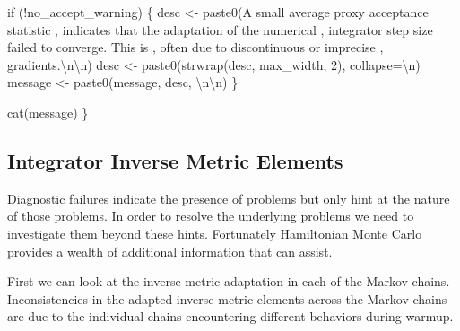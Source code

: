 \documentclass[
  letterpaper,
  DIV=11,
  numbers=noendperiod]{scrartcl}
\newenvironment{Shaded}{\begin{snugshade}}{\end{snugshade}}
\newcommand{\CharTok}[1]{\textcolor[rgb]{0.13,0.47,0.30}{#1}}
\newcommand{\ControlFlowTok}[1]{\textcolor[rgb]{0.00,0.23,0.31}{#1}}
\newcommand{\DecValTok}[1]{\textcolor[rgb]{0.68,0.00,0.00}{#1}}
\newcommand{\NormalTok}[1]{\textcolor[rgb]{0.00,0.23,0.31}{#1}}
\newcommand{\OperatorTok}[1]{\textcolor[rgb]{0.37,0.37,0.37}{#1}}
\newcommand{\StringTok}[1]{\textcolor[rgb]{0.13,0.47,0.30}{#1}}
\begin{document}
\begin{Shaded}
\begin{Highlighting}[]
  \ControlFlowTok{if}\NormalTok{ (}\OperatorTok{!}\NormalTok{no\_accept\_warning) \{}
\NormalTok{    desc }\OperatorTok{\textless{}{-}}\NormalTok{ paste0(}\StringTok{\textquotesingle{}A small average proxy acceptance statistic \textquotesingle{}}\NormalTok{,}
                   \StringTok{\textquotesingle{}indicates that the adaptation of the numerical \textquotesingle{}}\NormalTok{,}
                   \StringTok{\textquotesingle{}integrator step size failed to converge.  This is \textquotesingle{}}\NormalTok{,}
                   \StringTok{\textquotesingle{}often due to discontinuous or imprecise \textquotesingle{}}\NormalTok{,}
                   \StringTok{\textquotesingle{}gradients.}\CharTok{\textbackslash{}n\textbackslash{}n}\StringTok{\textquotesingle{}}\NormalTok{)}
\NormalTok{    desc }\OperatorTok{\textless{}{-}}\NormalTok{ paste0(strwrap(desc, max\_width, }\DecValTok{2}\NormalTok{), collapse}\OperatorTok{=}\StringTok{\textquotesingle{}}\CharTok{\textbackslash{}n}\StringTok{\textquotesingle{}}\NormalTok{)}
\NormalTok{    message }\OperatorTok{\textless{}{-}}\NormalTok{ paste0(message, desc, }\StringTok{\textquotesingle{}}\CharTok{\textbackslash{}n\textbackslash{}n}\StringTok{\textquotesingle{}}\NormalTok{)}
\NormalTok{  \}}

\NormalTok{  cat(message)}
\NormalTok{\}}
\end{Highlighting}
\end{Shaded}

\hypertarget{integrator-inverse-metric-elements}{%
\subsection{Integrator Inverse Metric
Elements}\label{integrator-inverse-metric-elements}}

Diagnostic failures indicate the presence of problems but only hint at
the nature of those problems. In order to resolve the underlying
problems we need to investigate them beyond these hints. Fortunately
Hamiltonian Monte Carlo provides a wealth of additional information that
can assist.

First we can look at the inverse metric adaptation in each of the Markov
chains. Inconsistencies in the adapted inverse metric elements across
the Markov chains are due to the individual chains encountering
different behaviors during warmup.
\end{document}
